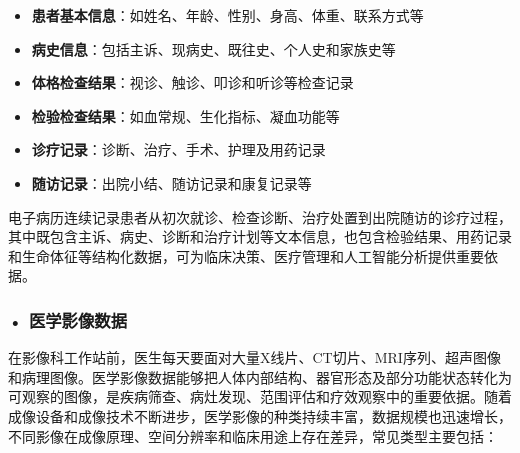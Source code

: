\begin{itemize}
\item \textbf{患者基本信息}：如姓名、年龄、性别、身高、体重、联系方式等
\item \textbf{病史信息}：包括主诉、现病史、既往史、个人史和家族史等
\item \textbf{体格检查结果}：视诊、触诊、叩诊和听诊等检查记录
\item \textbf{检验检查结果}：如血常规、生化指标、凝血功能等
\item \textbf{诊疗记录}：诊断、治疗、手术、护理及用药记录
\item \textbf{随访记录}：出院小结、随访记录和康复记录等
\end{itemize}


\indent 电子病历连续记录患者从初次就诊、检查诊断、治疗处置到出院随访的诊疗过程，其中既包含主诉、病史、诊断和治疗计划等文本信息，也包含检验结果、用药记录和生命体征等结构化数据，可为临床决策、医疗管理和人工智能分析提供重要依据。


\subsubsection*{\textbf{• 医学影像数据}}
在影像科工作站前，医生每天要面对大量X线片、CT切片、MRI序列、超声图像和病理图像。医学影像数据能够把人体内部结构、器官形态及部分功能状态转化为可观察的图像，是疾病筛查、病灶发现、范围评估和疗效观察中的重要依据。随着成像设备和成像技术不断进步，医学影像的种类持续丰富，数据规模也迅速增长，不同影像在成像原理、空间分辨率和临床用途上存在差异，常见类型主要包括：

